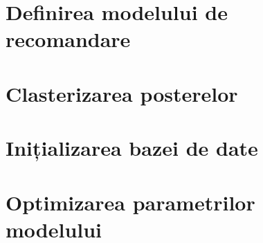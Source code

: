 \section{Definirea modelului de recomandare}

\section{Clasterizarea posterelor}

\section{Inițializarea bazei de date}

\section{Optimizarea parametrilor modelului}

